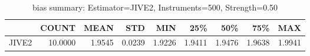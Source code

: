 \begin{table}[ht]
\centering
\caption{bias summary: Estimator=JIVE2, Instruments=500, Strength=0.50}
\begin{tabular}{lrrrrrrrr}
\toprule
 & COUNT & MEAN & STD & MIN & 25\% & 50\% & 75\% & MAX \\
\midrule
JIVE2 & 10.0000 & 1.9545 & 0.0239 & 1.9226 & 1.9411 & 1.9476 & 1.9638 & 1.9941 \\
\bottomrule
\end{tabular}
\end{table}
